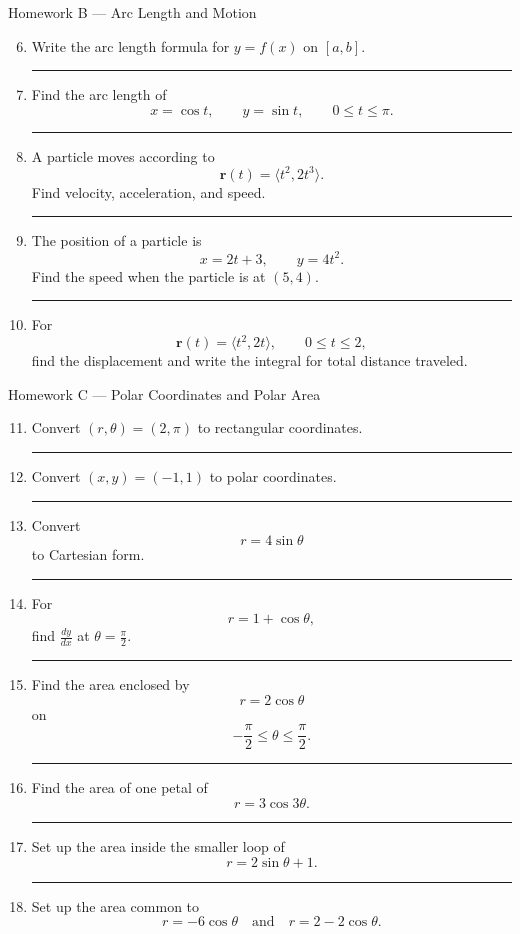 \documentclass[11pt]{article}
\newcommand{\hwspace}{\vspace{0.8em}\hrule\vspace{0.8em}}
\newcommand{\vect}[1]{\mathbf{#1}}
\begin{document}
\begin{homeworkset}{Homework B --- Arc Length and Motion}
\begin{enumerate}
\setcounter{enumi}{5}
    \item Write the arc length formula for \(y=f(x)\) on \([a,b]\).
    \hwspace

    \item Find the arc length of
    \[
    x=\cos t,\qquad y=\sin t,\qquad 0\le t\le \pi.
    \]
    \hwspace

    \item A particle moves according to
    \[
    \vect{r}(t)=\langle t^2,2t^3\rangle.
    \]
    Find velocity, acceleration, and speed.
    \hwspace

    \item The position of a particle is
    \[
    x=2t+3,\qquad y=4t^2.
    \]
    Find the speed when the particle is at \((5,4)\).
    \hwspace

    \item For
    \[
    \vect{r}(t)=\langle t^2,2t\rangle,\qquad 0\le t\le 2,
    \]
    find the displacement and write the integral for total distance traveled.
\end{enumerate}
\end{homeworkset}

\begin{homeworkset}{Homework C --- Polar Coordinates and Polar Area}
\begin{enumerate}
\setcounter{enumi}{10}
    \item Convert \((r,\theta)=(2,\pi)\) to rectangular coordinates.
    \hwspace

    \item Convert \((x,y)=(-1,1)\) to polar coordinates.
    \hwspace

    \item Convert
    \[
    r=4\sin\theta
    \]
    to Cartesian form.
    \hwspace

    \item For
    \[
    r=1+\cos\theta,
    \]
    find \(\frac{dy}{dx}\) at \(\theta=\frac{\pi}{2}\).
    \hwspace

    \item Find the area enclosed by
    \[
    r=2\cos\theta
    \]
    on
    \[
    -\frac{\pi}{2}\le\theta\le\frac{\pi}{2}.
    \]
    \hwspace

    \item Find the area of one petal of
    \[
    r=3\cos3\theta.
    \]
    \hwspace

    \item Set up the area inside the smaller loop of
    \[
    r=2\sin\theta+1.
    \]
    \hwspace

    \item Set up the area common to
    \[
    r=-6\cos\theta
    \quad\text{and}\quad
    r=2-2\cos\theta.
    \]
\end{enumerate}
\end{homeworkset}
\end{document}
